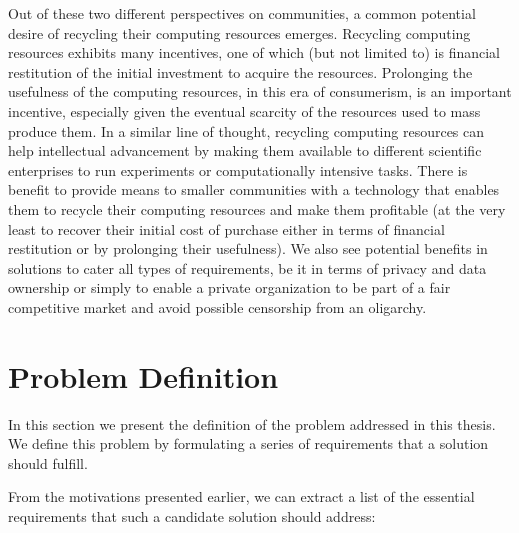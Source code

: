 \documentclass[12pt, titlepage]{uo_temp}
\begin{document}
     Out of these two different perspectives on communities, a common potential desire of
     recycling their computing resources emerges. 
     Recycling computing resources exhibits many incentives, one of which (but not limited
     to) is financial restitution of the initial investment to acquire the
     resources. Prolonging the usefulness of the computing resources, in this era of
     consumerism, is an important incentive, especially given the eventual scarcity of the
     resources used to mass produce them. In a similar line of thought, recycling
     computing resources can help intellectual advancement by making them available to
     different scientific enterprises to run experiments or computationally intensive
     tasks. There is benefit to provide means to smaller communities with a technology
     that enables them to recycle their computing resources and make them profitable (at
     the very least to recover their initial cost of purchase either in terms of financial
     restitution or by prolonging their usefulness).  We also see potential benefits in
     solutions to cater all types of requirements, be it in terms of privacy and data
     ownership or simply to enable a private organization to be part of a fair competitive
     market and avoid possible censorship from an oligarchy.

     \section{Problem Definition} \label{int_req}
     In this section we present the definition of the problem addressed in this thesis. We
     define this problem by formulating a series of requirements that a solution should
     fulfill.
     
     From the motivations presented earlier, we can extract a list of the essential
     requirements that such a candidate solution should address:
     
\end{document}
